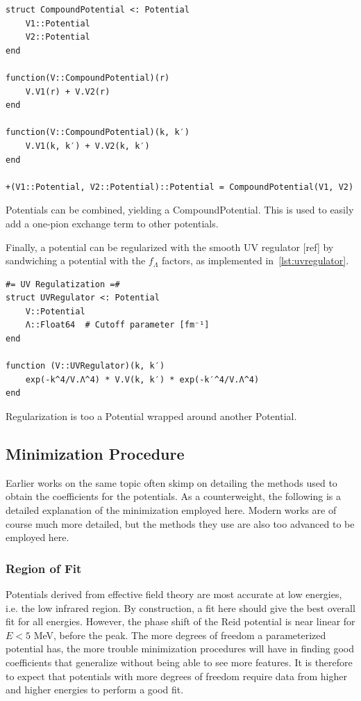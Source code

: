 \begin{listing}
\begin{verbatim}
struct CompoundPotential <: Potential
    V1::Potential
    V2::Potential
end

function(V::CompoundPotential)(r)
    V.V1(r) + V.V2(r)
end

function(V::CompoundPotential)(k, k′)
    V.V1(k, k′) + V.V2(k, k′)
end

+(V1::Potential, V2::Potential)::Potential = CompoundPotential(V1, V2)

\end{verbatim}
\caption{Potentials can be combined, yielding a \textsf{CompoundPotential}. This
is used to easily add a one-pion exchange term to other potentials.
\label{lst:compoundpotential}}
\end{listing}

Finally, a potential can be regularized with the smooth UV regulator [ref] by
sandwiching a potential with the \(f_{\Lambda}\) factors, as implemented in~\cref{lst:uvregulator}.

\begin{listing}
\begin{verbatim}
#= UV Regulatization =#
struct UVRegulator <: Potential
    V::Potential
    Λ::Float64  # Cutoff parameter [fm⁻¹]
end

function (V::UVRegulator)(k, k′)
    exp(-k^4/V.Λ^4) * V.V(k, k′) * exp(-k′^4/V.Λ^4)
end
\end{verbatim}
\caption{Regularization is too a \textsf{Potential} wrapped around another \textsf{Potential}.\label{lst:uvregulator}}
\end{listing}

\subsection{Minimization Procedure}

Earlier works on the same topic\cite{lepage1997renormalize,MACHLEIDT20111} often skimp on
detailing the methods used
to obtain the coefficients for the potentials. As a counterweight, the following is
a detailed explanation of the minimization employed here. Modern works are of
course much more detailed, but the methods they use are also too advanced to be
employed here.

\subsubsection{Region of Fit}
Potentials derived from effective field theory are most accurate at low
energies, i.e. the low infrared region. By construction, a fit here should give
the best overall fit for all energies. However, the phase
shift of the Reid potential is near linear for \(E<5\) MeV, before the peak. The
more degrees of freedom a parameterized potential has, the more trouble minimization
procedures will have in finding good coefficients that generalize without
being able to see more features. It is therefore to expect that potentials with
more degrees of freedom require data from higher and higher energies to perform
a good fit.

